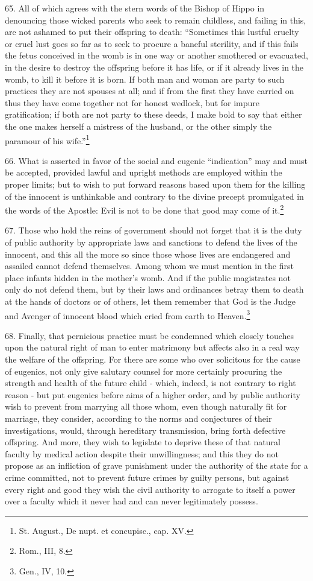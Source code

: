 \documentclass[12pt,a4paper]{book}
\begin{document}
65. All of which agrees with the stern words of the Bishop of Hippo in denouncing those wicked parents who seek to remain childless, and failing in this, are not ashamed to put their offspring to death: ``Sometimes this lustful cruelty or cruel lust goes so far as to seek to procure a baneful sterility, and if this fails the fetus conceived in the womb is in one way or another smothered or evacuated, in the desire to destroy the offspring before it has life, or if it already lives in the womb, to kill it before it is born. If both man and woman are party to such practices they are not spouses at all; and if from the first they have carried on thus they have come together not for honest wedlock, but for impure gratification; if both are not party to these deeds, I make bold to say that either the one makes herself a mistress of the husband, or the other simply the paramour of his wife.''\footnote{St. August., De nupt. et concupisc., cap. XV.}

66. What is asserted in favor of the social and eugenic ``indication'' may and must be accepted, provided lawful and upright methods are employed within the proper limits; but to wish to put forward reasons based upon them for the killing of the innocent is unthinkable and contrary to the divine precept promulgated in the words of the Apostle: Evil is not to be done that good may come of it.\footnote{Rom., III, 8.}

67. Those who hold the reins of government should not forget that it is the duty of public authority by appropriate laws and sanctions to defend the lives of the innocent, and this all the more so since those whose lives are endangered and assailed cannot defend themselves. Among whom we must mention in the first place infants hidden in the mother's womb. And if the public magistrates not only do not defend them, but by their laws and ordinances betray them to death at the hands of doctors or of others, let them remember that God is the Judge and Avenger of innocent blood which cried from earth to Heaven.\footnote{Gen., IV, 10.}

68. Finally, that pernicious practice must be condemned which closely touches upon the natural right of man to enter matrimony but affects also in a real way the welfare of the offspring. For there are some who over solicitous for the cause of eugenics, not only give salutary counsel for more certainly procuring the strength and health of the future child - which, indeed, is not contrary to right reason - but put eugenics before aims of a higher order, and by public authority wish to prevent from marrying all those whom, even though naturally fit for marriage, they consider, according to the norms and conjectures of their investigations, would, through hereditary transmission, bring forth defective offspring. And more, they wish to legislate to deprive these of that natural faculty by medical action despite their unwillingness; and this they do not propose as an infliction of grave punishment under the authority of the state for a crime committed, not to prevent future crimes by guilty persons, but against every right and good they wish the civil authority to arrogate to itself a power over a faculty which it never had and can never legitimately possess.
\end{document}
